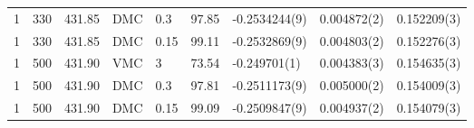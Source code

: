 \begin{tabular}{rrrllllll}
            1 &          330 &                431.85 &    DMC &      0.3 &  97.85 &                         -0.2534244(9) &                     0.004872(2) &                           0.152209(3) \\
            1 &          330 &                431.85 &    DMC &     0.15 &  99.11 &                         -0.2532869(9) &                     0.004803(2) &                           0.152276(3) \\
            1 &          500 &                431.90 &    VMC &        3 &  73.54 &                          -0.249701(1) &                     0.004383(3) &                           0.154635(3) \\
            1 &          500 &                431.90 &    DMC &      0.3 &  97.81 &                         -0.2511173(9) &                     0.005000(2) &                           0.154009(3) \\
            1 &          500 &                431.90 &    DMC &     0.15 &  99.09 &                         -0.2509847(9) &                     0.004937(2) &                           0.154079(3) \\
\bottomrule
\end{tabular}
